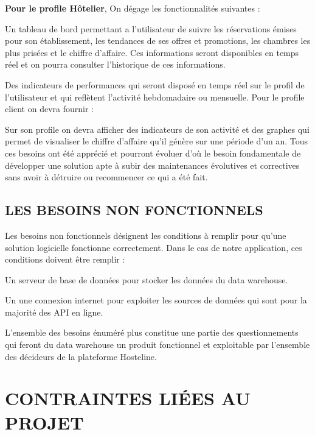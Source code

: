 \textbf{Pour le profile Hôtelier}, On dégage les fonctionnalités suivantes : 
   \begin{list}{•}{ }
   \item Un tableau de bord permettant a l’utilisateur de suivre les réservations émises pour son établissement, les tendances de ses offres et promotions, les chambres les plus prisées et le chiffre d’affaire. Ces informations seront disponibles en temps réel et on pourra consulter l’historique de ces informations.
   \item Des indicateurs de performances qui seront disposé en temps réel sur le profil de l’utilisateur et qui reflètent l’activité hebdomadaire ou mensuelle.
Pour le profile client on devra fournir :
   \item Sur son profile on devra afficher des indicateurs de son activité et des graphes qui permet de visualiser le chiffre d’affaire qu’il génère sur une période d'un an.
Tous ces besoins ont été apprécié et pourront évoluer d’où le besoin fondamentale de développer une solution apte à subir des maintenances évolutives et correctives sans avoir à détruire ou recommencer ce qui a été fait.
\end{list}



 \subsection{LES BESOINS NON FONCTIONNELS}
 
 Les besoins non fonctionnels désignent les conditions à remplir pour qu’une solution logicielle fonctionne correctement. Dans le cas de notre application, ces conditions doivent être remplir :
 \begin{list}{•}{ }
 \item Un serveur de base de données pour stocker les données du data warehouse.
 \item Un une connexion internet pour exploiter les sources de données qui sont pour la majorité des API en ligne.\\
 \end{list}


L’ensemble des besoins énuméré plus constitue une partie des questionnements qui feront du data warehouse  un produit fonctionnel et exploitable par l’ensemble des décideurs de la plateforme Hosteline.


 \section{CONTRAINTES LIÉES AU PROJET}
 
